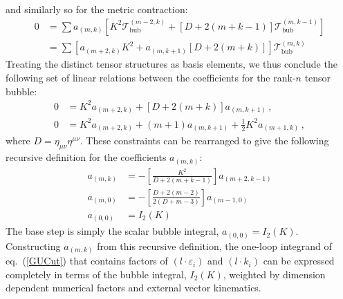 \documentclass[12pt,letter]{article}
\def\eqn#1{eq.~(\ref{#1})}
\begin{document}
and similarly so for the metric contraction:
\begin{align}
0 &= \sum a_{(m,k)}\left[K^2 \mathcal{T}^{(m-2,k)}_{\text{bub}} + \left[D+2(m+k-1)\right]\mathcal{T}^{(m,k-1)}_{\text{bub}}\right] 
\\
&= \sum \left[a_{(m+2,k)}K^2  + a_{(m,k+1)}\left[D+2(m+k)\right]\right] \mathcal{T}^{(m,k)}_{\text{bub}}
\end{align}
Treating the distinct tensor structures as basis elements, we thus conclude the following set of linear relations between the coefficients for the rank-$n$ tensor bubble:
\begin{align}
0&=K^2 a_{(m+2,k)}+[D+2(m+k)]a_{(m,k+1)}\,,
\\
0&=K^2a_{(m+2,k)}+(m+1)a_{(m,k+1)}+\frac{1}{2}K^2 a_{(m+1,k)}\,,
\end{align}
where $D= \eta_{\mu\nu}\eta^{\mu\nu}$. These constraints can be rearranged to give the following recursive definition for the coefficients $a_{(m,k)}$:
\begin{equation}\label{eq:bubRed}
\boxed{
\begin{aligned}
a_{(m,k)}&=- \left[\frac{K^2}{D+2(m+k-1)}\right]a_{(m+2,k-1)}
\\
 a_{(m,0)}&=-\left[\frac{D+2(m-2)}{2(D+m-3)}\right]a_{(m-1,0)}
 \\
 a_{(0,0)}&=I_2(K)
\end{aligned}
}
\end{equation}
The base step is simply the scalar bubble integral, $a_{(0,0)}=I_2(K)$. Constructing $a_{(m,k)}$ from this recursive definition, the one-loop integrand of \eqn{GUCut} that contains factors of $(l\!\cdot \!\varepsilon_i )$ and $(l\!\cdot \! k_i )$ can be expressed completely in terms of the bubble integral, $I_2(K)$, weighted by dimension dependent numerical factors and external vector kinematics.
\end{document}
